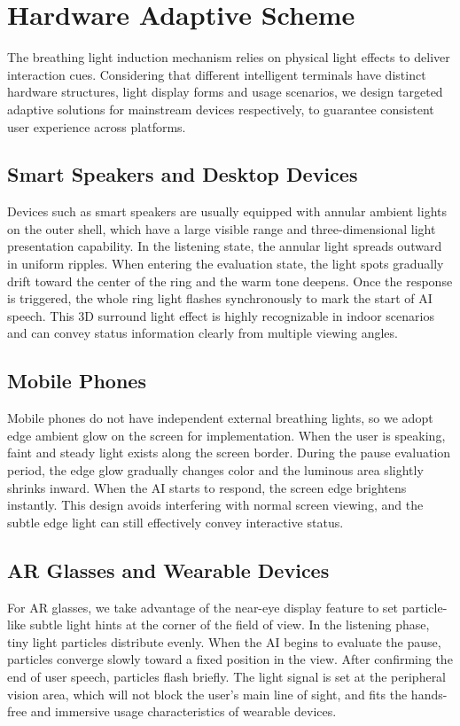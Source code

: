 \documentclass{article}
\begin{document}
\section{Hardware Adaptive Scheme}
The breathing light induction mechanism relies on physical light effects to deliver interaction
cues. Considering that different intelligent terminals have distinct hardware structures, light
display forms and usage scenarios, we design targeted adaptive solutions for mainstream
devices respectively, to guarantee consistent user experience across platforms.
\subsection{Smart Speakers and Desktop Devices}
Devices such as smart speakers are usually equipped with annular ambient lights on the
outer shell, which have a large visible range and three-dimensional light presentation
capability.
In the listening state, the annular light spreads outward in uniform ripples. When entering the
evaluation state, the light spots gradually drift toward the center of the ring and the warm
tone deepens. Once the response is triggered, the whole ring light flashes synchronously to
mark the start of AI speech. This 3D surround light effect is highly recognizable in indoor
scenarios and can convey status information clearly from multiple viewing angles.
\subsection{Mobile Phones}
Mobile phones do not have independent external breathing lights, so we adopt edge ambient
glow on the screen for implementation.
When the user is speaking, faint and steady light exists along the screen border. During the
pause evaluation period, the edge glow gradually changes color and the luminous area
slightly shrinks inward. When the AI starts to respond, the screen edge brightens instantly.
This design avoids interfering with normal screen viewing, and the subtle edge light can still
effectively convey interactive status.
\subsection{AR Glasses and Wearable Devices}
For AR glasses, we take advantage of the near-eye display feature to set particle-like subtle
light hints at the corner of the field of view.
In the listening phase, tiny light particles distribute evenly. When the AI begins to evaluate
the pause, particles converge slowly toward a fixed position in the view. After confirming the
end of user speech, particles flash briefly. The light signal is set at the peripheral vision area,
which will not block the user's main line of sight, and fits the hands-free and immersive
usage characteristics of wearable devices.
\end{document}
